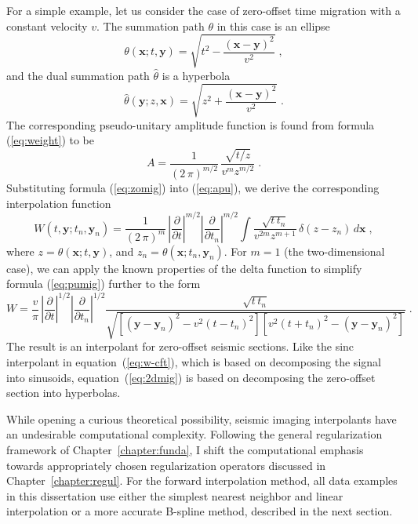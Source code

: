 For a simple example, let us consider the case of zero-offset time
migration with a constant velocity $v$. The summation path $\theta$
in this case is an ellipse
\begin{equation}
  \label{eq:ellips}
  \theta(\mathbf{x};t,\mathbf{y}) = \sqrt{t^2 -
    \frac{(\mathbf{x}-\mathbf{y})^2}{v^2}}\;,
\end{equation}
and the dual summation path $\widehat{\theta}$ is a hyperbola
\begin{equation}
  \label{eq:hyper}
  \widehat{\theta}(\mathbf{y};z,\mathbf{x}) = \sqrt{z^2 +
    \frac{(\mathbf{x}-\mathbf{y})^2}{v^2}}\;.
\end{equation}
The corresponding pseudo-unitary amplitude function is found from
formula (\ref{eq:weight}) to be \cite[]{Fomel.sep.92.267}
\begin{equation}
  A = {\frac{1}{\left(2\,\pi\right)^{m/2}}}\,
  {\frac{\sqrt{t/z}}{v^m z^{m/2}}}\;.
\label{eq:zomig}
\end{equation}
Substituting formula (\ref{eq:zomig}) into (\ref{eq:apu}), we derive
the corresponding interpolation function
\begin{equation}
  \label{eq:pumig}
  W (t, \mathbf{y}; t_n, \mathbf{y}_n)
  = \frac{1}{\left(2\,\pi\right)^{m}} \,
  \left|\frac{\partial}{\partial t}\right|^{m/2}
  \left|\frac{\partial}{\partial t_n}\right|^{m/2} \int
  \frac{\sqrt{t\,t_n}}{v^{2m} z^{m+1}}\,
  \delta (z - z_n) \,d \mathbf{x}\;,
\end{equation}
where $z = \theta(\mathbf{x};t,\mathbf{y})$, and $z_n =
\theta(\mathbf{x};t_n,\mathbf{y}_n)$. For $m=1$ (the two-dimensional
case), we can apply the known properties of the delta function to
simplify formula (\ref{eq:pumig}) further to the form
\begin{equation}
  W
  = {\frac{v}{\pi}}\,
  {\left|\frac{\partial}{\partial t}\right|^{1/2}
    \left|\frac{\partial}{\partial t_n}\right|^{1/2}
    \frac{\sqrt{t\,t_n}}{\sqrt{
	\left[(\mathbf{y}-\mathbf{y}_n)^2 - v^2 (t - t_n)^2\right]
	\left[v^2 (t + t_n)^2 - (\mathbf{y}-\mathbf{y}_n)^2\right]
  }}}\;.
  \label{eq:2dmig}
\end{equation}
The result is an interpolant for zero-offset seismic sections.  Like
the sinc interpolant in equation~(\ref{eq:w-cft}), which is based on
decomposing the signal into sinusoids, equation~(\ref{eq:2dmig}) is
based on decomposing the zero-offset section into hyperbolas. 

While opening a curious theoretical possibility, seismic imaging
interpolants have an undesirable computational complexity. Following
the general regularization framework of Chapter~\ref{chapter:funda}, I
shift the computational emphasis towards appropriately chosen
regularization operators discussed in Chapter~\ref{chapter:regul}.
For the forward interpolation method, all data examples in this
dissertation use either the simplest nearest neighbor and linear
interpolation or a more accurate B-spline method, described in the
next section.

